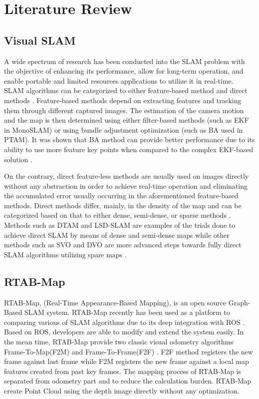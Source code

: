 \documentclass[12pt]{article}
\begin{document}
\section{Literature Review}
\subsection{Visual SLAM}
\indent A wide spectrum of research has been conducted into the SLAM problem with the objective of enhancing its performance, allow for long-term operation, and enable portable and limited resources applications to utilize it in real-time. SLAM algorithms can be categorized to either feature-based method and direct methods \cite{taketomi2017visual}. Feature-based methods depend on extracting features and tracking them through different captured images. The estimation of the camera motion and the map is then determined using either filter-based methods (such as EKF in MonoSLAM) or using bundle adjustment optimization (such as BA used in PTAM). It was shown that BA method can provide better performance due to its ability to use more feature key points when compared to the complex EKF-based solution \cite{strasdat2012visual}. 

On the contrary, direct feature-less methods are usually used on images directly without any abstraction \cite{taketomi2017visual} in order to achieve real-time operation and eliminating the accumulated error usually occurring in the aforementioned feature-based methods. Direct methods differ, mainly, in the density of the map and can be categorized based on that to either dense, semi-dense, or sparse methods \cite{taketomi2017visual}. Methods such as DTAM and LSD-SLAM are examples of the trials done to achieve direct SLAM by means of dense and semi-dense maps while other methods such as SVO and DVO are more advanced steps towards fully direct SLAM algorithms utilizing spare maps \cite{cadena2016past}\cite{taketomi2017visual}.
\subsection{RTAB-Map}
RTAB-Map, (Real-Time Appearance-Based Mapping), is an open source Graph-Based SLAM system. RTAB-Map recently has been used as a platform to comparing various of SLAM algorithms due to its deep integration with ROS \cite{labbe2019rtab}. Based on ROS, developers are able to modify and extend the system easily. In the mean time, RTAB-Map provide two classic visual odometry algorithms Frame-To-Map(F2M) and Frame-To-Frame(F2F) \cite{Fraundorfer2012}. F2F method registers the new frame against last frame while F2M registers the new frame against a local map features created from past key frames. The mapping process of RTAB-Map is separated from odometry part and to reduce the calculation burden. RTAB-Map create Point Cloud using the depth image directly without any optimization. 
\end{document}
